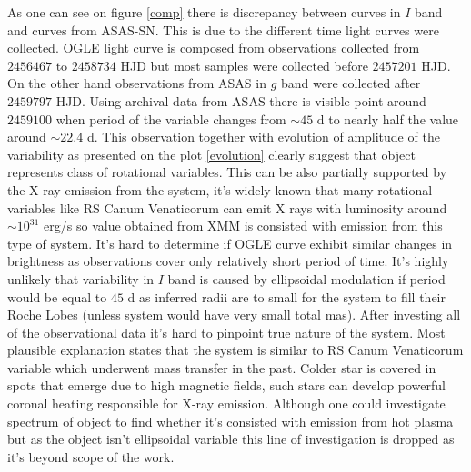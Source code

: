 \documentclass{pracalicmgr}
\begin{document}
As one can see on figure \ref{comp} there is discrepancy between curves in $I$ band and curves from ASAS-SN. This is due to the different time light curves were collected. OGLE 
light curve is composed from observations collected from $2456467$ to $2458734$ HJD but most samples were collected before $2457201$ HJD. On the other hand
observations from ASAS in $g$ band were collected after $2459797$ HJD. Using archival data from ASAS there is visible point around $2459100$ when period of the 
variable changes from $\sim 45$ d to nearly half the value around $\sim22.4$ d. This observation together with evolution of amplitude of the variability as presented on the
plot \ref{evolution} clearly suggest that object represents class of rotational variables. This can be also partially supported by the X ray emission from the system, 
it's widely known that many rotational variables like RS Canum Venaticorum can emit X rays with luminosity around $\sim 10^{31}$ erg/s  \citep{walter_x-rays_1980} so value obtained from XMM 
is consisted with emission from this type of system. It's hard to determine if OGLE curve exhibit similar changes in brightness as observations cover only relatively short period of time.
It's highly unlikely that variability in $I$ band is caused by ellipsoidal modulation if period would be equal to $45$ d as inferred radii are to small for the system to fill their Roche Lobes 
(unless system would have very small total mas). After investing all of the observational data it's hard to pinpoint true nature of the system. Most plausible 
explanation states that the system is similar to RS Canum Venaticorum variable which underwent mass transfer in the past. Colder star is covered in spots 
that emerge due to high magnetic fields, such stars can develop powerful coronal heating responsible for X-ray emission. Although one could investigate spectrum 
of object to find whether it's consisted with emission from hot plasma but as the object isn't ellipsoidal variable this line of investigation is dropped as it's beyond
scope of the work.%
\end{document}
